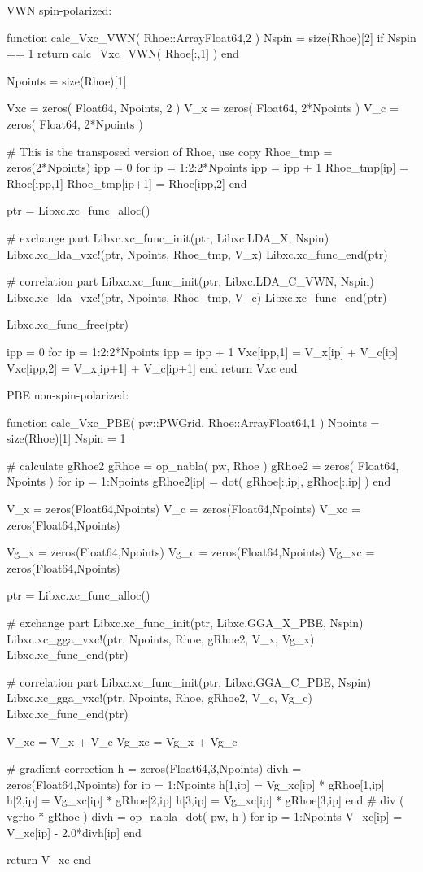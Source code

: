 VWN spin-polarized:
\begin{juliacode}
function calc_Vxc_VWN( Rhoe::Array{Float64,2} )
    Nspin = size(Rhoe)[2]
    if Nspin == 1
        return calc_Vxc_VWN( Rhoe[:,1] )
    end

    Npoints = size(Rhoe)[1]

    Vxc = zeros( Float64, Npoints, 2 )
    V_x = zeros( Float64, 2*Npoints )
    V_c = zeros( Float64, 2*Npoints )

    # This is the transposed version of Rhoe, use copy
    Rhoe_tmp = zeros(2*Npoints)
    ipp = 0
    for ip = 1:2:2*Npoints
        ipp = ipp + 1
        Rhoe_tmp[ip] = Rhoe[ipp,1]
        Rhoe_tmp[ip+1] = Rhoe[ipp,2]
    end

    ptr = Libxc.xc_func_alloc()

    # exchange part
    Libxc.xc_func_init(ptr, Libxc.LDA_X, Nspin)
    Libxc.xc_lda_vxc!(ptr, Npoints, Rhoe_tmp, V_x)
    Libxc.xc_func_end(ptr)

    # correlation part
    Libxc.xc_func_init(ptr, Libxc.LDA_C_VWN, Nspin)
    Libxc.xc_lda_vxc!(ptr, Npoints, Rhoe_tmp, V_c)
    Libxc.xc_func_end(ptr)

    Libxc.xc_func_free(ptr)

    ipp = 0
    for ip = 1:2:2*Npoints
        ipp = ipp + 1
        Vxc[ipp,1] = V_x[ip] + V_c[ip]
        Vxc[ipp,2] = V_x[ip+1] + V_c[ip+1]
    end
    return Vxc
end
\end{juliacode}

PBE non-spin-polarized:
\begin{juliacode}
function calc_Vxc_PBE( pw::PWGrid, Rhoe::Array{Float64,1} )
    Npoints = size(Rhoe)[1]
    Nspin = 1

    # calculate gRhoe2
    gRhoe = op_nabla( pw, Rhoe )
    gRhoe2 = zeros( Float64, Npoints )
    for ip = 1:Npoints
        gRhoe2[ip] = dot( gRhoe[:,ip], gRhoe[:,ip] )
    end

    V_x = zeros(Float64,Npoints)
    V_c = zeros(Float64,Npoints)
    V_xc = zeros(Float64,Npoints)

    Vg_x = zeros(Float64,Npoints)
    Vg_c = zeros(Float64,Npoints)
    Vg_xc = zeros(Float64,Npoints)

    ptr = Libxc.xc_func_alloc()

    # exchange part
    Libxc.xc_func_init(ptr, Libxc.GGA_X_PBE, Nspin)
    Libxc.xc_gga_vxc!(ptr, Npoints, Rhoe, gRhoe2, V_x, Vg_x)
    Libxc.xc_func_end(ptr)

    # correlation part
    Libxc.xc_func_init(ptr, Libxc.GGA_C_PBE, Nspin)
    Libxc.xc_gga_vxc!(ptr, Npoints, Rhoe, gRhoe2, V_c, Vg_c)
    Libxc.xc_func_end(ptr)

    V_xc = V_x + V_c
    Vg_xc = Vg_x + Vg_c

    # gradient correction
    h = zeros(Float64,3,Npoints)
    divh = zeros(Float64,Npoints)
    for ip = 1:Npoints
        h[1,ip] = Vg_xc[ip] * gRhoe[1,ip]
        h[2,ip] = Vg_xc[ip] * gRhoe[2,ip]
        h[3,ip] = Vg_xc[ip] * gRhoe[3,ip]
    end
    # div ( vgrho * gRhoe )
    divh = op_nabla_dot( pw, h )
    for ip = 1:Npoints
        V_xc[ip] = V_xc[ip] - 2.0*divh[ip]
    end

    return V_xc
end
\end{juliacode}

